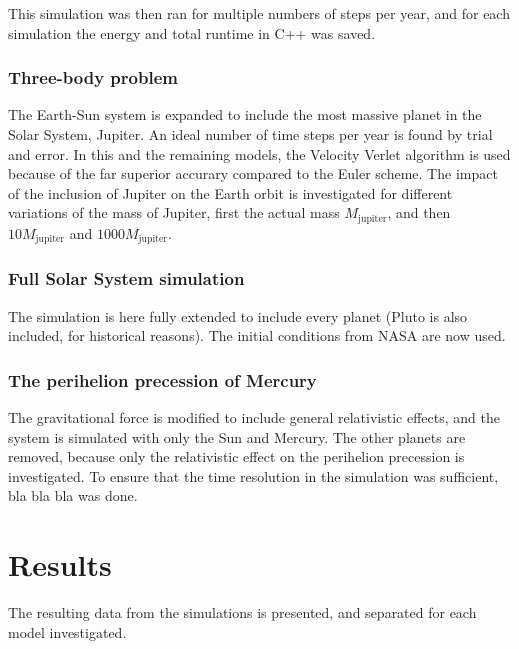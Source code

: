 \documentclass[aps,reprint]{revtex4-1}
\begin{document}
This simulation was then ran for multiple numbers of steps per year, and for
each simulation the energy and total runtime in C++ was saved.
\subsubsection{Three-body problem}
The Earth-Sun system is expanded to include the most massive planet in the Solar System, Jupiter.
An ideal number of time steps per year is found by trial and error. In this and the remaining models, the Velocity
Verlet algorithm is used because of the far superior accurary compared to the
Euler scheme. The impact of the inclusion of Jupiter on the Earth orbit is investigated
for different variations of the mass of Jupiter, first the actual mass $M_\text{jupiter}$,
and then $10 M_\text{jupiter}$ and $1000 M_\text{jupiter}$.
\subsubsection{Full Solar System simulation}
The simulation is here fully extended to include every planet (Pluto is also included,
for historical reasons). The initial
conditions from NASA are now used.
\subsubsection{The perihelion precession of Mercury}
The gravitational force is modified to include general relativistic effects, and
the system is simulated with only the Sun and Mercury. The other planets are removed,
because only the relativistic effect on the perihelion precession is investigated.
To ensure that the time resolution in the simulation was sufficient, bla bla bla
was done.
\section{Results}
The resulting data from the simulations is presented, and separated for each
model investigated.
\label{sec:results}
\end{document}
